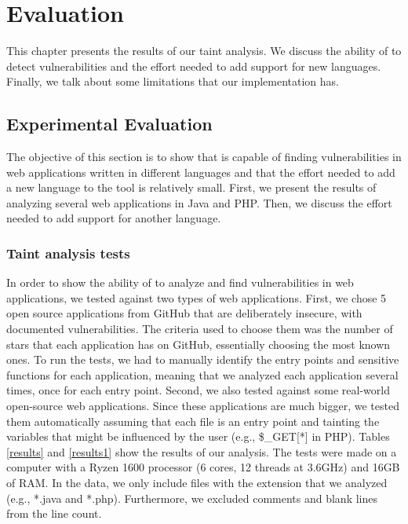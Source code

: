 
\chapter{Evaluation}
\label{chapter:results}

This chapter presents the results of our taint analysis. We discuss the ability of \toolname{} to detect vulnerabilities and the effort needed to add support for new languages. Finally, we talk about some limitations that our implementation has.

\section{Experimental Evaluation}
\label{evaluation}
The objective of this section is to show that \toolname{} is capable of finding vulnerabilities in web applications written in different languages and that the effort needed to add a new language to the tool is relatively small. First, we present the results of analyzing several web applications in Java and PHP. Then, we discuss the effort needed to add support for another language.


\subsection{Taint analysis tests}
In order to show the ability of \toolname{} to analyze and find vulnerabilities in web applications, we tested \toolname{} against two types of web applications. First, we chose 5 open source applications from GitHub that are deliberately insecure, with documented vulnerabilities. The criteria used to choose them was the number of stars that each application has on GitHub, essentially choosing the most known ones. To run the tests, we had to manually identify the entry points and sensitive functions for each application, meaning that we analyzed each application several times, once for each entry point. Second, we also tested \toolname{} against some real-world open-source web applications. Since these applications are much bigger, we tested them automatically assuming that each file is an entry point and tainting the variables that might be influenced by the user (e.g., \$\_GET[*] in PHP). Tables \ref{results} and \ref{results1} show the results of our analysis. The tests were made on a computer with a Ryzen 1600 processor (6 cores, 12 threads at 3.6GHz) and 16GB of RAM. In the data, we only include files with the extension that we analyzed (e.g., *.java and *.php). Furthermore, we excluded comments and blank lines from the line count. 

